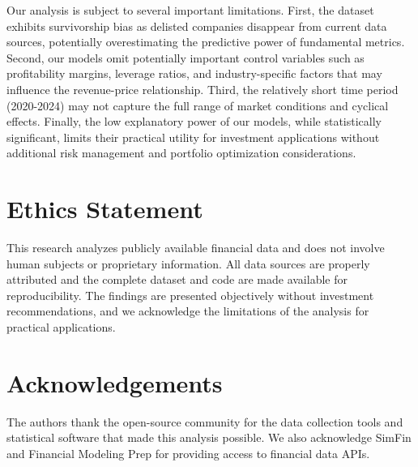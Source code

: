 \documentclass[11pt]{article}
\begin{document}
Our analysis is subject to several important limitations. First, the dataset exhibits survivorship bias as delisted companies disappear from current data sources, potentially overestimating the predictive power of fundamental metrics. Second, our models omit potentially important control variables such as profitability margins, leverage ratios, and industry-specific factors that may influence the revenue-price relationship. Third, the relatively short time period (2020-2024) may not capture the full range of market conditions and cyclical effects. Finally, the low explanatory power of our models, while statistically significant, limits their practical utility for investment applications without additional risk management and portfolio optimization considerations.

\section*{Ethics Statement}

This research analyzes publicly available financial data and does not involve human subjects or proprietary information. All data sources are properly attributed and the complete dataset and code are made available for reproducibility. The findings are presented objectively without investment recommendations, and we acknowledge the limitations of the analysis for practical applications.

\section*{Acknowledgements}

The authors thank the open-source community for the data collection tools and statistical software that made this analysis possible. We also acknowledge SimFin and Financial Modeling Prep for providing access to financial data APIs.



\end{document}
